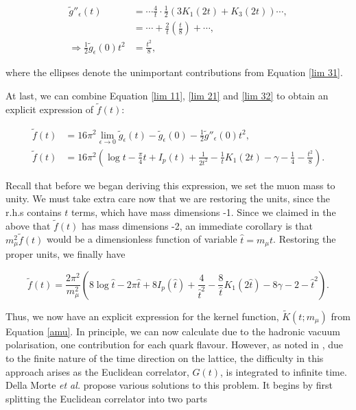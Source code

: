 \documentclass{article}
\numberwithin{equation}{section} %
\begin{document}
\begin{equation}
\begin{split}
\tilde{g}''_\epsilon(t) &= \cdots \frac{4}{t}\cdot \frac{1}{2}(3K_1(2t) + K_3(2t)) \cdots ,\\
&= \cdots + \frac{2}{t} (\frac{t}{8}) + \cdots,\\
\Rightarrow \frac{1}{2}\tilde{g}_\epsilon(0)t^2 &= \frac{t^2}{8},
\end{split}
\label{lim 32}
\end{equation}

\noindent where the ellipses denote the unimportant contributions from Equation \ref{lim 31}.

At last, we can combine Equation \ref{lim 11}, \ref{lim 21} and \ref{lim 32} to obtain an explicit expression of $\tilde{f}(t)$:

\begin{equation}
\begin{split}
\tilde{f}(t)&= 16\pi^2 \lim_{\epsilon\rightarrow 0}\tilde{g}_\epsilon(t) - \tilde{g}_\epsilon(0) - \frac{1}{2} \tilde{g}''_\epsilon(0)t^2,\\
\tilde{f}(t)&= 16\pi^2 (\log t - \frac{\pi}{4}t + I_p(t) + \frac{1}{2t^2} - \frac{1}{t}K_1(2t) - \gamma - \frac{1}{4} - \frac{t^2}{8}).
\end{split}
\end{equation}

Recall that before we began deriving this expression, we set the muon mass to unity. We must take extra care now that we are restoring the units, since the r.h.s contains $t$ terms, which have mass dimensions -1. Since we claimed in the above that $\tilde{f}(t)$ has mass dimensions -2, an immediate corollary is that $m_\mu^2\tilde{f}(t)$ would be a dimensionless function of variable $\hat{t}=m_\mu t$. Restoring the proper units, we finally have

\begin{equation}
\tilde{f}(t)= \frac{2\pi^2}{m_\mu^2}(8\log \hat{t} - 2\pi \hat{t} + 8I_p(\hat{t}) + \frac{4}{\hat{t}^2} - \frac{8}{\hat{t}}K_1(2\hat{t}) - 8\gamma - 2 - \hat{t}^2).
\label{ftilde final}
\end{equation}

Thus, we now have an explicit expression for the kernel function, $\tilde{K}(t;m_\mu)$ from Equation \ref{amu}. In principle, we can now calculate \amu due to the hadronic vacuum polarisation, one contribution for each quark flavour. However, as noted in \cite{dellamorte}, due to the finite nature of the time direction on the lattice, the difficulty in this approach arises as the Euclidean correlator, $G(t)$, is integrated to infinite time. Della Morte \textit{et al.} propose various solutions to this problem. It begins by first splitting the Euclidean correlator into two parts
\end{document}

